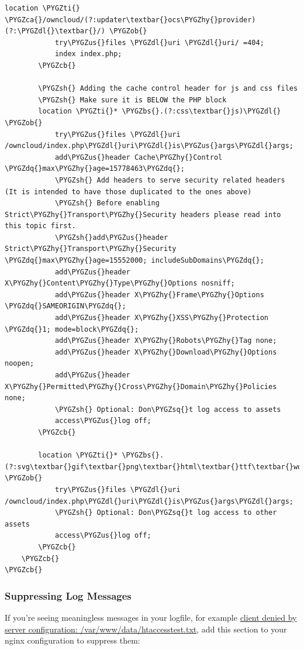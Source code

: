 \documentclass[letterpaper,10pt,english]{sphinxmanual}
\def\PYGZbs{\char`\\}
\def\PYGZus{\char`\_}
\def\PYGZob{\char`\{}
\def\PYGZcb{\char`\}}
\def\PYGZca{\char`\^}
\def\PYGZsh{\char`\#}
\def\PYGZdl{\char`\$}
\def\PYGZhy{\char`\-}
\def\PYGZsq{\char`\'}
\def\PYGZdq{\char`\"}
\def\PYGZti{\char`\~}
\begin{document}
\begin{Verbatim}[commandchars=\\\{\}]
        location \PYGZti{} \PYGZca{}/owncloud/(?:updater\textbar{}ocs\PYGZhy{}provider)(?:\PYGZdl{}\textbar{}/) \PYGZob{}
            try\PYGZus{}files \PYGZdl{}uri \PYGZdl{}uri/ =404;
            index index.php;
        \PYGZcb{}

        \PYGZsh{} Adding the cache control header for js and css files
        \PYGZsh{} Make sure it is BELOW the PHP block
        location \PYGZti{}* \PYGZbs{}.(?:css\textbar{}js)\PYGZdl{} \PYGZob{}
            try\PYGZus{}files \PYGZdl{}uri /owncloud/index.php\PYGZdl{}uri\PYGZdl{}is\PYGZus{}args\PYGZdl{}args;
            add\PYGZus{}header Cache\PYGZhy{}Control \PYGZdq{}max\PYGZhy{}age=15778463\PYGZdq{};
            \PYGZsh{} Add headers to serve security related headers  (It is intended to have those duplicated to the ones above)
            \PYGZsh{} Before enabling Strict\PYGZhy{}Transport\PYGZhy{}Security headers please read into this topic first.
            \PYGZsh{}add\PYGZus{}header Strict\PYGZhy{}Transport\PYGZhy{}Security \PYGZdq{}max\PYGZhy{}age=15552000; includeSubDomains\PYGZdq{};
            add\PYGZus{}header X\PYGZhy{}Content\PYGZhy{}Type\PYGZhy{}Options nosniff;
            add\PYGZus{}header X\PYGZhy{}Frame\PYGZhy{}Options \PYGZdq{}SAMEORIGIN\PYGZdq{};
            add\PYGZus{}header X\PYGZhy{}XSS\PYGZhy{}Protection \PYGZdq{}1; mode=block\PYGZdq{};
            add\PYGZus{}header X\PYGZhy{}Robots\PYGZhy{}Tag none;
            add\PYGZus{}header X\PYGZhy{}Download\PYGZhy{}Options noopen;
            add\PYGZus{}header X\PYGZhy{}Permitted\PYGZhy{}Cross\PYGZhy{}Domain\PYGZhy{}Policies none;
            \PYGZsh{} Optional: Don\PYGZsq{}t log access to assets
            access\PYGZus{}log off;
        \PYGZcb{}

        location \PYGZti{}* \PYGZbs{}.(?:svg\textbar{}gif\textbar{}png\textbar{}html\textbar{}ttf\textbar{}woff\textbar{}ico\textbar{}jpg\textbar{}jpeg)\PYGZdl{} \PYGZob{}
            try\PYGZus{}files \PYGZdl{}uri /owncloud/index.php\PYGZdl{}uri\PYGZdl{}is\PYGZus{}args\PYGZdl{}args;
            \PYGZsh{} Optional: Don\PYGZsq{}t log access to other assets
            access\PYGZus{}log off;
        \PYGZcb{}
    \PYGZcb{}
\PYGZcb{}
\end{Verbatim}


\subsubsection{Suppressing Log Messages}
\label{installation/nginx_examples:suppressing-log-messages}
If you're seeing meaningless messages in your logfile, for example \href{https://central.owncloud.org/t/htaccesstest-txt-errors-in-logfiles/831}{client
denied by server configuration: /var/www/data/htaccesstest.txt},
add this section to your nginx configuration to suppress them:
\end{document}
